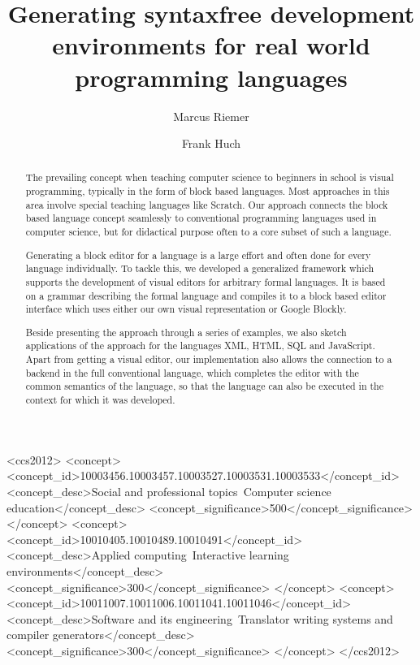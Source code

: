 \documentclass[sigconf,natbib=false]{acmart}
\begin{document}
\title[]{Generating syntaxfree development environments for real world programming languages}

\author{Marcus Riemer}

\author{Frank Huch}

\begin{CCSXML}
<ccs2012>
   <concept>
       <concept_id>10003456.10003457.10003527.10003531.10003533</concept_id>
       <concept_desc>Social and professional topics~Computer science education</concept_desc>
       <concept_significance>500</concept_significance>
       </concept>
   <concept>
       <concept_id>10010405.10010489.10010491</concept_id>
       <concept_desc>Applied computing~Interactive learning environments</concept_desc>
       <concept_significance>300</concept_significance>
       </concept>
   <concept>
       <concept_id>10011007.10011006.10011041.10011046</concept_id>
       <concept_desc>Software and its engineering~Translator writing systems and compiler generators</concept_desc>
       <concept_significance>300</concept_significance>
       </concept>
 </ccs2012>
\end{CCSXML}



\begin{abstract}
  The prevailing concept when teaching computer science to beginners in school is visual programming, typically in the form of block based languages. Most approaches in this area involve special teaching languages like Scratch. Our approach connects the block based language concept seamlessly to conventional programming languages used in computer science, but for didactical purpose often to a core subset of such a language.

  Generating a block editor for a language is a large effort and often done for every language individually. To tackle this, we developed a generalized framework which supports the development of visual editors for arbitrary formal languages. It is based on a grammar describing the formal language and compiles it to a block based editor interface which uses either our own visual representation or Google Blockly.

  Beside presenting the approach through a series of examples, we also sketch applications of the approach for the languages XML, HTML, SQL and JavaScript. Apart from getting a visual editor, our implementation also allows the connection to a backend in the full conventional language, which completes the editor with the common semantics of the language, so that the language can also be executed in the context for which it was developed.
\end{abstract}
\end{document}
